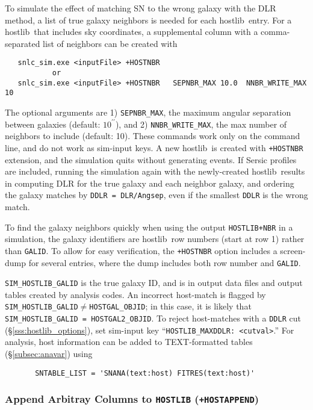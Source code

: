 \documentclass[12pt]{article}
\newcommand{\hostlib}{{\sc hostlib}}
\begin{document}
{To simulate the effect of matching SN to the wrong galaxy 
with the DLR method,
a list of true galaxy neighbors is needed for each \hostlib\ entry. 
For a \hostlib\ that includes sky coordinates, a supplemental 
column with a comma-separated list of neighbors can be created with
%
\begin{verbatim}
   snlc_sim.exe <inputFile> +HOSTNBR
           or
   snlc_sim.exe <inputFile> +HOSTNBR   SEPNBR_MAX 10.0  NNBR_WRITE_MAX 10
\end{verbatim}
%
The optional arguments are 
1) {\tt SEPNBR\_MAX}, the maximum angular separation between galaxies
  (default: $10^{\prime\prime}$), and
2) {\tt NNBR\_WRITE\_MAX}, the max number of neighbors to include
  (default: 10).
These commands work only on the command line, and do not work
as sim-input keys. A new \hostlib\ is created with {\tt +HOSTNBR}
extension, and the simulation quits without generating events.
If Sersic profiles are included, running the simulation again with the 
newly-created \hostlib\ results in computing DLR for the true galaxy and
each neighbor galaxy, and ordering the galaxy matches by 
{\tt DDLR = DLR/Angsep}, 
even if the smallest {\tt DDLR} is the wrong match.

To find the galaxy neighbors quickly when using the output 
{\tt HOSTLIB+NBR}
in a simulation,
the galaxy identifiers are \hostlib\ row numbers (start at row 1)
rather than {\tt GALID}.
To allow for easy verification, the {\tt +HOSTNBR} option includes a 
screen-dump for several entries,
where the dump includes both row number and {\tt GALID}.

{\tt SIM\_HOSTLIB\_GALID} is the true galaxy ID, and is in 
output data files and output tables created by analysis codes.
An incorrect host-match is flagged by
{\tt SIM\_HOSTLIB\_GALID}$\ne${\tt HOSTGAL\_OBJID};
in this case, it is likely that
{\tt SIM\_HOSTLIB\_GALID = HOSTGAL2\_OBJID}.
To reject host-matches with a {\tt DDLR} cut
(\S\ref{sss:hostlib_options}),
set sim-input key ``{\tt HOSTLIB\_MAXDDLR: <cutval>}.''  
For analysis, host information can be added to TEXT-formatted
tables (\S\ref{subsec:anavar}) using 
\begin{verbatim}
       SNTABLE_LIST = 'SNANA(text:host) FITRES(text:host)'
\end{verbatim}

\subsubsection{Append Arbitray Columns to {\tt HOSTLIB} ({\tt +HOSTAPPEND})}
\label{sss:hostlib_append}

}
\end{document}
